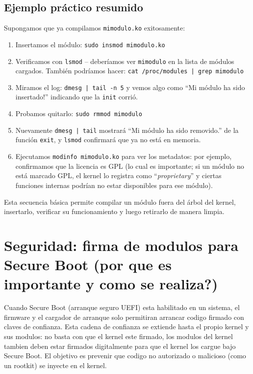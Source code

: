 \subsection*{Ejemplo práctico resumido}
Supongamos que ya compilamos \texttt{mimodulo.ko} exitosamente:
\begin{enumerate}
  \item Insertamos el módulo:\newline
    \texttt{sudo insmod mimodulo.ko}
  \item Verificamos con \texttt{lsmod} – deberíamos ver \texttt{mimodulo} en la lista de módulos cargados. También podríamos hacer:\newline
    \texttt{cat /proc/modules | grep mimodulo}
  \item Miramos el log:\newline
    \texttt{dmesg | tail -n 5}\newline
    y vemos algo como ``Mi módulo ha sido insertado!'' indicando que la \texttt{init} corrió.
  \item Probamos quitarlo:\newline
    \texttt{sudo rmmod mimodulo}
  \item Nuevamente \texttt{dmesg | tail} mostrará ``Mi módulo ha sido removido.'' de la función \texttt{exit}, y \texttt{lsmod} confirmará que ya no está en memoria.
  \item Ejecutamos \texttt{modinfo mimodulo.ko} para ver los metadatos: por ejemplo, confirmamos que la licencia es GPL (lo cual es importante; si un módulo no está marcado GPL, el kernel lo registra como ``\emph{proprietary}'' y ciertas funciones internas podrían no estar disponibles para ese módulo).
\end{enumerate}

Esta secuencia básica permite compilar un módulo fuera del árbol del kernel, insertarlo, verificar su funcionamiento y luego retirarlo de manera limpia.

\section{Seguridad: firma de modulos para Secure Boot (por que es importante y como se realiza?)}

Cuando Secure Boot (arranque seguro UEFI) esta habilitado en un sistema, el firmware y el cargador de arranque solo permitiran arrancar codigo firmado con claves de confianza. Esta cadena de confianza se extiende hasta el propio kernel y sus modulos: no basta con que el kernel este firmado, los modulos del kernel tambien deben estar firmados digitalmente para que el kernel los cargue bajo Secure Boot. El objetivo es prevenir que codigo no autorizado o malicioso (como un rootkit) se inyecte en el kernel.

